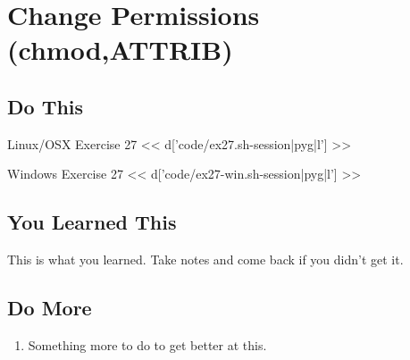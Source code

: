 \chapter{Change Permissions (chmod,ATTRIB)}

\section{Do This}

\begin{code}{Linux/OSX Exercise 27}
<< d['code/ex27.sh-session|pyg|l'] >>
\end{code}

\begin{code}{Windows Exercise 27}
<< d['code/ex27-win.sh-session|pyg|l'] >>
\end{code}

\section{You Learned This}

This is what you learned.  Take notes and come back if you didn't get it.

\section{Do More}

\begin{enumerate}
\item Something more to do to get better at this.
\end{enumerate}

